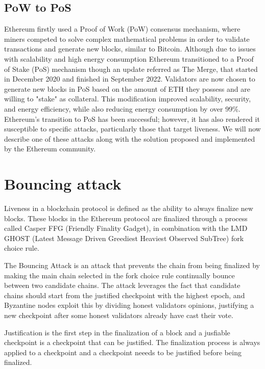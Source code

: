 \subsection{PoW to PoS}\label{sub:pow_to_pos}

Ethereum firstly used a Proof of Work (PoW) consensus mechanism, where miners competed to solve complex mathematical problems
in order to validate transactions and generate new blocks, similar to Bitcoin.
Although due to issues with scalability and high energy consumption Ethereum transitioned to a Proof of Stake (PoS) mechanism though an update
referred as The Merge, that started in December 2020 and finished in September 2022.
Validators are now chosen to generate new blocks in PoS based on the amount of ETH they possess and are willing to "stake" as collateral.
This modification improved scalability, security, and energy efficiency, while also reducing energy consumption by over 99\%.
Ethereum's transition to PoS has been successful; however, it has also rendered it susceptible to specific attacks, particularly those that target liveness.
We will now describe one of these attacks along with the solution proposed and implemented by the Ethereum community.

\section{Bouncing attack}\label{sub:bouncing_attack}

Liveness in a blockchain protocol is defined as the ability to always finalize new blocks. These blocks in the
Ethereum protocol are finalized through a process called Casper FFG (Friendly Finality Gadget), in combination with
the LMD GHOST (Latest Message Driven Greediest Heaviest Observed SubTree) fork choice rule.

The Bouncing Attack is an attack that prevents the chain from being finalized by making the main chain
selected in the fork choice rule continually bounce between two candidate chains. The attack leverages the fact that
candidate chains should start from the justified checkpoint with the highest epoch, and Byzantine nodes exploit this by
dividing honest validators opinions, justifying a new checkpoint after some honest validators already have cast their vote.

Justification is the first step in the finalization of a block and a jusfiable checkpoint is a checkpoint that can be justified.
The finalization process is always applied to a checkpoint and a checkpoint neeeds to be justified before being finalized.

